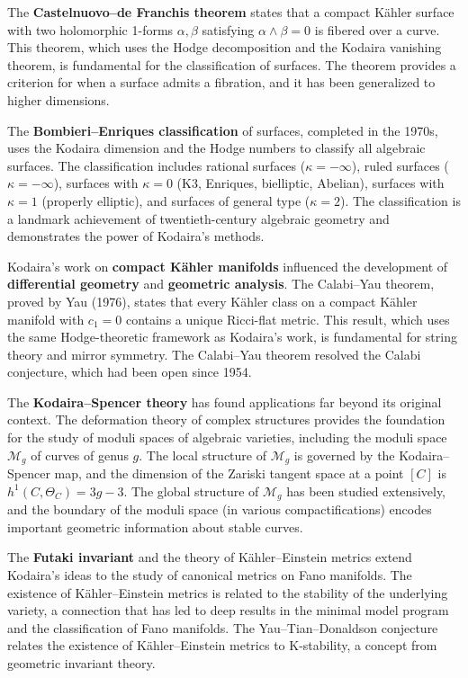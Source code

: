 The \textbf{Castelnuovo--de Franchis theorem} states that a compact
K{\"a}hler surface with two holomorphic 1-forms $\alpha, \beta$
satisfying $\alpha \wedge \beta = 0$ is fibered over a curve. This
theorem, which uses the Hodge decomposition and the Kodaira vanishing
theorem, is fundamental for the classification of surfaces. The theorem
provides a criterion for when a surface admits a fibration, and it has
been generalized to higher dimensions.

The \textbf{Bombieri--Enriques classification} of surfaces, completed
in the 1970s, uses the Kodaira dimension and the Hodge numbers to
classify all algebraic surfaces. The classification includes rational
surfaces ($\kappa = -\infty$), ruled surfaces ($\kappa = -\infty$),
surfaces with $\kappa = 0$ (K3, Enriques, bielliptic, Abelian),
surfaces with $\kappa = 1$ (properly elliptic), and surfaces of general
type ($\kappa = 2$). The classification is a landmark achievement of
twentieth-century algebraic geometry and demonstrates the power of
Kodaira's methods.

Kodaira's work on \textbf{compact K{\"a}hler manifolds} influenced the
development of \textbf{differential geometry} and \textbf{geometric
analysis}. The Calabi--Yau theorem, proved by Yau (1976), states that
every K{\"a}hler class on a compact K{\"a}hler manifold with $c_1 = 0$
contains a unique Ricci-flat metric. This result, which uses the same
Hodge-theoretic framework as Kodaira's work, is fundamental for string
theory and mirror symmetry. The Calabi--Yau theorem resolved the Calabi
conjecture, which had been open since 1954.

The \textbf{Kodaira--Spencer theory} has found applications far beyond
its original context. The deformation theory of complex structures
provides the foundation for the study of moduli spaces of algebraic
varieties, including the moduli space $\mathcal{M}_g$ of curves of
genus $g$. The local structure of $\mathcal{M}_g$ is governed by the
Kodaira--Spencer map, and the dimension of the Zariski tangent space at
a point $[C]$ is $h^1(C, \Theta_C) = 3g-3$. The global structure of
$\mathcal{M}_g$ has been studied extensively, and the boundary of the
moduli space (in various compactifications) encodes important geometric
information about stable curves.

The \textbf{Futaki invariant} and the theory of K{\"a}hler--Einstein
metrics extend Kodaira's ideas to the study of canonical metrics on
Fano manifolds. The existence of K{\"a}hler--Einstein metrics is
related to the stability of the underlying variety, a connection that
has led to deep results in the minimal model program and the
classification of Fano manifolds. The Yau--Tian--Donaldson conjecture
relates the existence of K{\"a}hler--Einstein metrics to K-stability,
a concept from geometric invariant theory.

